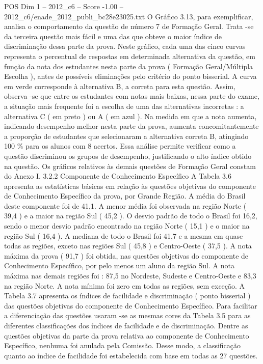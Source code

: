 \begin{textsample}{POS Dim 1 – 2012\_c6 – Score -1.00 – 2012\_c6/enade\_2012\_publi\_bc28e23025.txt}
O Gráfico 3.13, para exemplificar, analisa o comportamento da questão de número 7 de Formação Geral.
Trata -se da terceira questão mais fácil e uma das que obteve o maior índice de discriminação dessa parte da prova.
Neste gráfico, cada uma das cinco curvas representa o percentual de respostas em determinada alternativa da questão, em função da nota dos estudantes nesta parte da prova ( Formação Geral/Múltipla Escolha ), antes de possíveis eliminações pelo critério do ponto bisserial.
A curva em verde corresponde à alternativa B, a correta para esta questão.
Assim, observa -se que entre os estudantes com notas mais baixas, nessa parte do exame, a situação mais frequente foi a escolha de uma das alternativas incorretas : a alternativa C ( em preto ) ou A ( em azul ).
Na medida em que a nota aumenta, indicando desempenho melhor nesta parte da prova, aumenta concomitantemente a proporção de estudantes que selecionaram a alternativa correta B, atingindo 100 \% para os alunos com 8 acertos.
Essa análise permite verificar como a questão discriminou os grupos de desempenho, justificando o alto índice obtido na questão.
Os gráficos relativos às demais questões de Formação Geral constam do Anexo I. 3.2.2 Componente de Conhecimento Específico A Tabela 3.6 apresenta as estatísticas básicas em relação às questões objetivas do componente de Conhecimento Específico da prova, por Grande Região.
A média do Brasil deste componente foi de 41,1.
A menor média foi observada na região Norte ( 39,4 ) e a maior na região Sul ( 45,2 ).
O desvio padrão de todo o Brasil foi 16,2, sendo o menor desvio padrão encontrado na região Norte ( 15,1 ) e o maior na região Sul ( 16,4 ).
A mediana de todo o Brasil foi 41,7 e a mesma em quase todas as regiões, exceto nas regiões Sul ( 45,8 ) e Centro-Oeste ( 37,5 ).
A nota máxima da prova ( 91,7 ) foi obtida, nas questões objetivas do componente de Conhecimento Específico, por pelo menos um aluno da região Sul.
A nota máxima nas demais regiões foi : 87,5 no Nordeste, Sudeste e Centro-Oeste e 83,3 na região Norte.
A nota mínima foi zero em todas as regiões, sem exceção.
A Tabela 3.7 apresenta os índices de facilidade e discriminação ( ponto bisserial ) das questões objetivas do componente de Conhecimento Específico.
Para facilitar a diferenciação das questões usaram -se as mesmas cores da Tabela 3.5 para as diferentes classificações dos índices de facilidade e de discriminação.
Dentre as questões objetivas da parte da prova relativa ao componente de Conhecimento Específico, nenhuma foi anulada pela Comissão.
Desse modo, a classificação quanto ao índice de facilidade foi estabelecida com base em todas as 27 questões.

\end{textsample}
